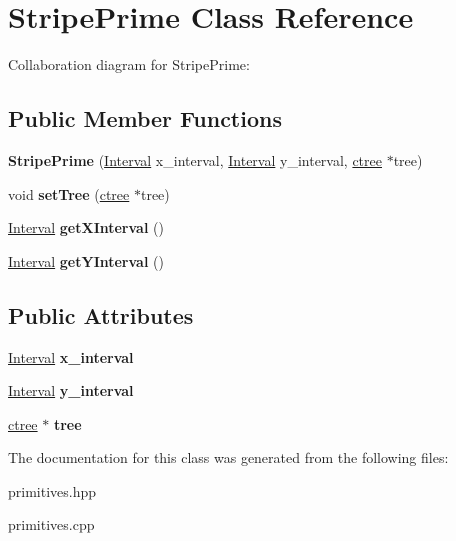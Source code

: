 \hypertarget{classStripePrime}{}\section{Stripe\+Prime Class Reference}
\label{classStripePrime}


Collaboration diagram for Stripe\+Prime\+:
\subsection*{Public Member Functions}
\begin{DoxyCompactItemize}
\item 
\mbox{\label{classStripePrime_a0c745dcc08e46292689766e45e6c9e54}} 
{\bfseries Stripe\+Prime} (\hyperlink{classInterval}{Interval} x\+\_\+interval, \hyperlink{classInterval}{Interval} y\+\_\+interval, \hyperlink{classctree}{ctree} $\ast$tree)
\item 
\mbox{\label{classStripePrime_aee4fefcc9c3e850f73187d8aa859e658}} 
void {\bfseries set\+Tree} (\hyperlink{classctree}{ctree} $\ast$tree)
\item 
\mbox{\label{classStripePrime_af4886dd218f6d112979af84d1b3e12f6}} 
\hyperlink{classInterval}{Interval} {\bfseries get\+X\+Interval} ()
\item 
\mbox{\label{classStripePrime_a4a7a44141952bacd0e9aff750381368e}} 
\hyperlink{classInterval}{Interval} {\bfseries get\+Y\+Interval} ()
\end{DoxyCompactItemize}
\subsection*{Public Attributes}
\begin{DoxyCompactItemize}
\item 
\mbox{\label{classStripePrime_ac89ff54e25f8870769ac69719847762d}} 
\hyperlink{classInterval}{Interval} {\bfseries x\+\_\+interval}
\item 
\mbox{\label{classStripePrime_a8e6dbaddc02aa0e078800331645224d2}} 
\hyperlink{classInterval}{Interval} {\bfseries y\+\_\+interval}
\item 
\mbox{\label{classStripePrime_a6250dd3296a92550f5a4be5a9b892f8e}} 
\hyperlink{classctree}{ctree} $\ast$ {\bfseries tree}
\end{DoxyCompactItemize}


The documentation for this class was generated from the following files\+:\begin{DoxyCompactItemize}
\item 
primitives.\+hpp\item 
primitives.\+cpp\end{DoxyCompactItemize}
